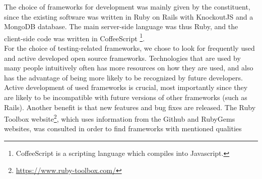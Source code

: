 
The choice of frameworks for development was mainly given by the
constituent, since the existing software was written in Ruby on Rails
with KnockoutJS and a MongoDB database. The main server-side language
was thus Ruby, and the client-side code was written in CoffeeScript
\footnote{CoffeeScript is a scripting language which compiles into
Javascript.}.\\

For the choice of testing-related frameworks, we chose to look for
frequently used and active developed open source frameworks.
Technologies that are used by many people intuitively often has more
resources on how they are used, and also has the advantage of being more
likely to be recognized by future developers. Active development of used
frameworks is crucial, most importantly since they are likely to be
incompatible with future versions of other frameworks (such as Rails).
Another benefit is that new features and bug fixes are released. The
Ruby Toolbox website\footnote{\url{https://www.ruby-toolbox.com/}},
which uses information from the Github and RubyGems websites, was
consulted in order to find frameworks with mentioned qualities
